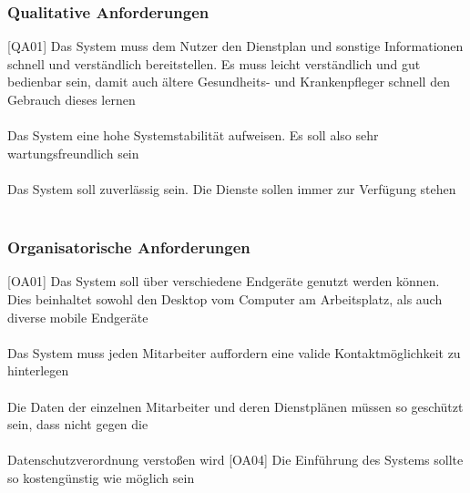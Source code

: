 \documentclass[11pt,
paper=a4,
bibtotocnumbered,	  %
liststotocnumbered,  %
DIV=calc,		  %
tablecaptionabove,	  %
headinclude,
]{article}
\begin{document}
\subsubsection{Qualitative Anforderungen}
[QA01] Das System muss dem Nutzer den Dienstplan und sonstige Informationen schnell und verständlich bereitstellen. Es muss leicht verständlich und gut bedienbar sein, damit auch ältere Gesundheits- und Krankenpfleger schnell den Gebrauch dieses lernen\\\\
[QA02] Das System eine hohe Systemstabilität aufweisen. Es soll also sehr wartungsfreundlich sein\\\\
[QA03] Das System soll zuverlässig sein. Die Dienste sollen immer zur Verfügung stehen\\\\
\subsubsection{Organisatorische Anforderungen}
[OA01] Das System soll über verschiedene Endgeräte genutzt werden können. Dies beinhaltet sowohl den Desktop vom Computer am Arbeitsplatz, als auch diverse mobile Endgeräte\\\\
[OA02] Das System muss jeden Mitarbeiter auffordern eine valide Kontaktmöglichkeit zu hinterlegen\\\\
[OA03] Die Daten der einzelnen Mitarbeiter und deren Dienstplänen müssen so geschützt sein, dass nicht gegen die\\\\ Datenschutzverordnung verstoßen wird
[OA04] Die Einführung des Systems sollte so kostengünstig wie möglich sein\\\\
\end{document}
